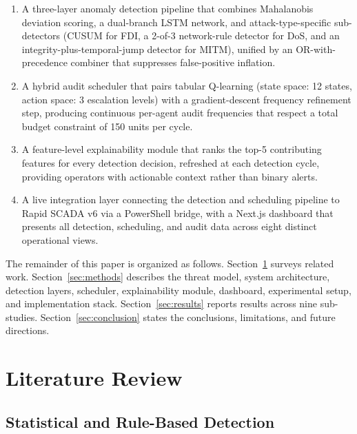 \begin{enumerate}
    \item A three-layer anomaly detection pipeline that combines Mahalanobis deviation scoring, a
    dual-branch LSTM network, and attack-type-specific sub-detectors (CUSUM for FDI, a 2-of-3
    network-rule detector for DoS, and an integrity-plus-temporal-jump detector for MITM), unified
    by an OR-with-precedence combiner that suppresses false-positive inflation.

    \item A hybrid audit scheduler that pairs tabular Q-learning (state space: 12 states, action
    space: 3 escalation levels) with a gradient-descent frequency refinement step, producing
    continuous per-agent audit frequencies that respect a total budget constraint of 150 units per
    cycle.

    \item A feature-level explainability module that ranks the top-5 contributing features for every
    detection decision, refreshed at each detection cycle, providing operators with actionable
    context rather than binary alerts.

    \item A live integration layer connecting the detection and scheduling pipeline to Rapid SCADA v6
    via a PowerShell bridge, with a Next.js dashboard that presents all detection, scheduling, and
    audit data across eight distinct operational views.
\end{enumerate}

The remainder of this paper is organized as follows. Section~\ref{sec:lit} surveys related work.
Section~\ref{sec:methods} describes the threat model, system architecture, detection layers,
scheduler, explainability module, dashboard, experimental setup, and implementation stack.
Section~\ref{sec:results} reports results across nine sub-studies. Section~\ref{sec:conclusion}
states the conclusions, limitations, and future directions.

\section{Literature Review}
\label{sec:lit}

\subsection{Statistical and Rule-Based Detection}

